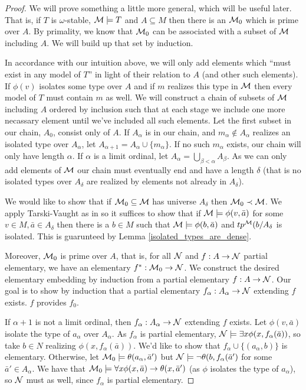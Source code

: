 \begin{proof}\label{proof_omst_prime} 
We will prove something a little more general, which will be useful later.
That is, if \(T\) is \(\omega\)-stable, \(\mathcal{M} \models T\) and \(A \subseteq M\) then there is an \(\mathcal{M}_0\) which is prime over \(A\). 
By primality, we know that \(\mathcal{M}_0\) can be associated with a subset of \(\mathcal{M}\) including \(A\). 
We will build up that set by induction. 

In accordance with our intuition above, we will only add elements which ``must exist in any model of \(T\)'' in light of their relation to \(A\) (and other such elements).
If \(\phi(v)\) isolates some type over \(A\) and if \(m\) realizes this type in \(\mathcal{M}\) then every model of \(T\) must contain \(m\) as well. 
We will construct a chain of subsets of \(\mathcal{M}\) including \(A\) ordered by inclusion such that at each stage we include one more necassary element until we've included all such elements. 
Let the first subset in our chain, \(A_0\), consist only of \(A\). 
If \(A_\alpha\) is in our chain, and \(m_\alpha \notin A_\alpha\) realizes an isolated type over \(A_\alpha\), let \(A_{\alpha+1} = A_\alpha \cup \{m_\alpha\}\).
If no such \(m_\alpha\) exists, our chain will only have length \(\alpha\). 
If \(\alpha\) is a limit ordinal, let \(A_\alpha = \bigcup_{\beta < \alpha} A_\beta\). 
As we can only add elements of \(\mathcal{M}\) our chain must eventually end and have a length \(\delta\) (that is no isolated types over \(A_\delta\) are realized by elements not already in \(A_\delta\)).

We would like to show that if \(\mathcal{M}_0 \subseteq \mathcal{M}\) has universe \(A_\delta\) then \(\mathcal{M}_0 \prec \mathcal{M}\).
We apply Tarski-Vaught as in %
so it suffices to show that if \(\mathcal{M} \models \phi(v, \bar{a})\) for some \(v \in M, \bar{a} \in A_\delta\) then there is a \(b \in M\) such that \(\mathcal{M} \models \phi(b, \bar{a})\) and \(tp^{\mathcal{M}}(b/A_\delta\) is isolated. 
This is guarunteed by Lemma \ref{isolated_types_are_dense}.

Moreover, \(\mathcal{M}_0\) is prime over \(A\), that is, for all \(\mathcal{N}\) and \(f: A \to \mathcal{N}\) partial elementary, we have an elementary \(f^*: \mathcal{M}_0 \to \mathcal{N}\). 
We construct the desired elementary embedding by induction from a partial elementary \(f: A \to \mathcal{N}\).  
Our goal is to show by induction that a partial elementary \(f_\alpha:A_\alpha \to \mathcal{N}\) extending \(f\) exists. 
\(f\) provides \(f_0\).

If \(\alpha + 1\) is not a limit ordinal, then \(f_\alpha: A_\alpha \to \mathcal{N}\) extending \(f\) exists. 
Let \(\phi(v, \bar{a})\) isolate the type of \(a_\alpha\) over \(A_\alpha\). 
As \(f_\alpha\) is partial elementary, \(\mathcal{N} \models \exists x \phi(x, f_\alpha(\bar{a}))\), so take \(b \in N\) realizing \(\phi(x, f_\alpha(\bar{a}))\).
We'd like to show that \(f_\alpha \cup \{(a_\alpha, b)\}\) is elementary. 
Otherwise, let \(\mathcal{M}_0 \models \theta(a_\alpha, \bar{a}')\) but \(\mathcal{N} \models \neg\theta(b, f_\alpha(\bar{a}')\) for some \(\bar{a}' \in A_\alpha\). 
We have that \(\mathcal{M}_0 \models \forall x \phi(x, \bar{a}) \to \theta(x, \bar{a}')\) (as \(\phi\) isolates the type of \(a_\alpha\)), so \(\mathcal{N}\) must as well, since \(f_\alpha\) is partial elementary.


\end{proof}
